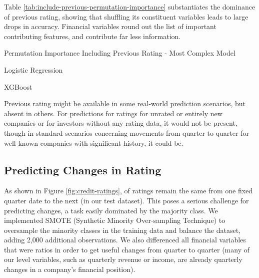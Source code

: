 \documentclass{article}[11pt]
\begin{document}
    Table \ref{tab:include-previous-permutation-importance} substantiates the dominance of previous rating, showing that shuffling its constituent variables leads to large drops in accuracy. Financial variables round out the list of important contributing features, and contribute far less information.

    \begin{table}[h!]
        \centering
        \caption{Permutation Importance Including Previous Rating - Most Complex Model}
        \begin{minipage}[c]{0.495\linewidth}
            \centering
            
            \caption*{\footnotesize Logistic Regression} 
        \end{minipage}
        \begin{minipage}[c]{0.495\linewidth}
            \centering
            
            \caption*{\footnotesize XGBoost} 
        \end{minipage}
        \label{tab:include-previous-permutation-importance}
    \end{table}

    Previous rating might be available in some real-world prediction scenarios, but absent in others. For predictions for ratings for unrated or entirely new companies or for investors without any rating data, it would not be present, though in standard scenarios concerning movements from quarter to quarter for well-known companies with significant history, it could be.

    \clearpage
    \newpage

    \subsection{Predicting Changes in Rating}

    \label{sec:change-prediction}

    As shown in Figure \ref{fig:credit-ratings}, \shareNotChanges \space of ratings remain the same from one fixed quarter date to the next (\shareNotChangesTest \space in our test dataset). This poses a serious challenge for predicting changes, a task easily dominated by the majority class. We implemented SMOTE (Synthetic Minority Over-sampling Technique) \citep{chawla_smote_2002} to oversample the minority classes in the training data and balance the dataset, adding 2,000 additional observations. We also differenced all financial variables that were ratios in order to get useful changes from quarter to quarter (many of our level variables, such as quarterly revenue or income, are already quarterly changes in a company's financial position).
\end{document}
